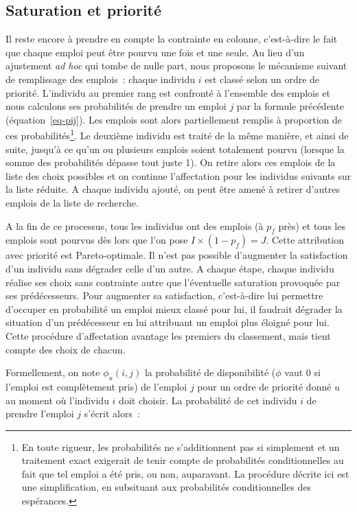 \documentclass[
  10pt,
  a4paper,
  numbers=noendperiod,
  DIV=9]{scrartcl}
\begin{document}
\hypertarget{sec-priorite}{%
\subsection{Saturation et priorité}\label{sec-priorite}}

Il reste encore à prendre en compte la contrainte en colonne,
c'est-à-dire le fait que chaque emploi peut être pourvu une fois et une
seule. Au lieu d'un ajustement \emph{ad hoc} qui tombe de nulle part,
nous proposons le mécanisme suivant de remplissage des emplois~: chaque
individu \(i\) est classé selon un ordre de priorité. L'individu au
premier rang est confronté à l'ensemble des emplois et nous calculons
ses probabilités de prendre un emploi \(j\) par la formule précédente
(équation~\ref{eq-pij}). Les emplois sont alors partiellement remplis à
proportion de ces probabilités\footnote{En toute rigueur, les
  probabilités ne s'additionnent pas si simplement et un traitement
  exact exigerait de tenir compte de probabilités conditionnelles au
  fait que tel emploi a été pris, ou non, auparavant. La procédure
  décrite ici est une simplification, en subsituant aux probabilités
  conditionnelles des espérances.}. Le deuxième individu est traité de
la même manière, et ainsi de suite, jusqu'à ce qu'un ou plusieurs
emplois soient totalement pourvu (lorsque la somme des probabilités
dépasse tout juste 1). On retire alors ces emplois de la liste des choix
possibles et on continue l'affectation pour les individus suivants sur
la liste réduite. A chaque individu ajouté, on peut être amené à retirer
d'autres emplois de la liste de recherche.

A la fin de ce processus, tous les individus ont des emplois (à \(p_f\)
près) et tous les emplois sont pourvus dès lors que l'on pose
\(I \times (1 - p_f) = J\). Cette attribution avec priorité est
Pareto-optimale. Il n'est pas possible d'augmenter la satisfaction d'un
individu sans dégrader celle d'un autre. A chaque étape, chaque individu
réalise ses choix sans contrainte autre que l'éventuelle saturation
provoquée par ses prédécesseurs. Pour augmenter sa satisfaction,
c'est-à-dire lui permettre d'occuper en probabilité un emploi mieux
classé pour lui, il faudrait dégrader la situation d'un prédécesseur en
lui attribuant un emploi plus éloigné pour lui. Cette procédure
d'affectation avantage les premiers du classement, mais tient compte des
choix de chacun.

Formellement, on note \(\phi_u(i,j)\) la probabilité de disponibilité
(\(\phi\) vaut 0 si l'emploi est complètement pris) de l'emploi \(j\)
pour un ordre de priorité donné \(u\) au moment où l'individu \(i\) doit
choisir. La probabilité de cet individu \(i\) de prendre l'emploi \(j\)
s'écrit alors~:
\end{document}
